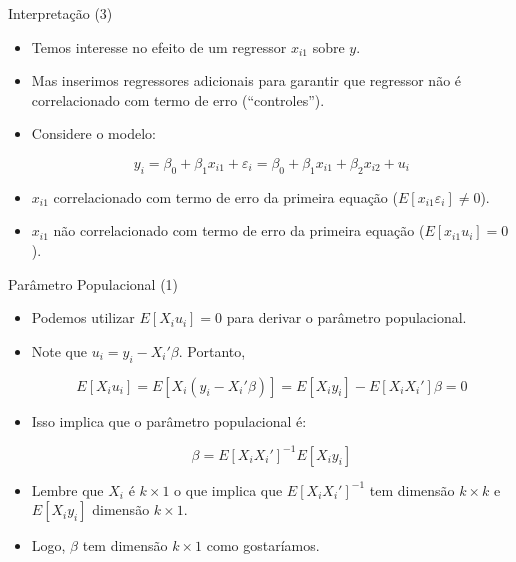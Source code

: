 \documentclass[10pt,slides,xcolor=pdftex,dvipsnames,table]{beamer}
\begin{document}

\begin{frame}{Interpretação (3)}

\begin{itemize}\itemsep1.2em 
	
	\item Temos interesse no efeito de um regressor $x_{i1}$ sobre $y$.
	
	\item Mas inserimos regressores adicionais para garantir que regressor não é correlacionado com termo de erro (``controles'').  
	
	\item Considere o modelo:
	
	$$ y_i = \beta_0 + \beta_1 x_{i1} + \varepsilon_i  = \beta_0 + \beta_1 x_{i1} + \beta_2 x_{i2} + u_i $$
	
	\item $x_{i1}$ correlacionado com termo de erro da primeira equação ($E[ x_{i1} \varepsilon_i ] \neq 0$).
	
	\item $x_{i1}$ não correlacionado com termo de erro da primeira equação ($E[ x_{i1} u_i ] = 0$).
        
\end{itemize}

\end{frame}


\begin{frame}{Parâmetro Populacional (1)}

\begin{itemize}\itemsep1.2em
    
    \item Podemos utilizar $ E[X_i u_i ] = 0 $ para derivar o parâmetro populacional.
    
	\item Note que $u_i =   y_i - X_i' \beta$. Portanto,
	  
    $$ E[X_i u_i ] = E[X_i(y_i - X_i' \beta)] = E[X_i y_i] - E[X_i X_i'] \beta = 0 $$
    
    \item Isso implica que o parâmetro populacional é: 
    
    $$ \beta = E[X_i X_i']^{-1} E[X_i y_i] $$
    
    \item Lembre que $X_i$ é $k \times 1$ o que implica que $E [ X_i X_i' ]^{-1}$ tem dimensão $k \times k$ e $E[X_i y_i]$ dimensão $k \times 1$. 
    
    \item Logo, $\beta$ tem dimensão $k \times 1$ como gostaríamos.  
        
\end{itemize}

\end{frame}
\end{document}

